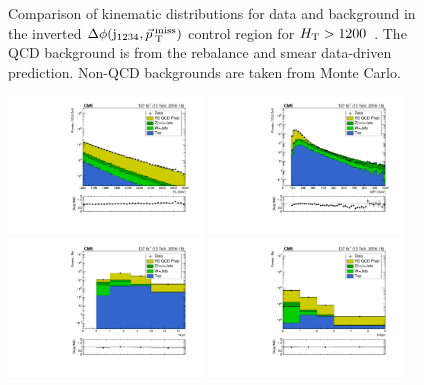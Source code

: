 \begin{figure}[!htbp]
\begin{center}
    \caption{Comparison of kinematic distributions for data and background in the inverted $\Delta\phi(\mathrm{j}_{1234},\vec{p}_{\> \mathrm{T}}^{\> \mathrm{miss}})$ control region for $H_{\mathrm{T}} > 1200$~\GeV. The QCD background is from the
             rebalance and smear data-driven prediction. Non-QCD backgrounds are taken from Monte Carlo.
            }
    \label{Fig:rs_crRSInvertDPhiInclusiveHT1200toInf}
  \end{center}
\end{figure}

\begin{figure}[!htbp]
  \begin{center}
    \includegraphics[width=0.46\textwidth]{figs/qcd/rs_data/c_crRSMT2SideBandInclusiveHT1200toInf_h_ht.pdf}
    \includegraphics[width=0.46\textwidth]{figs/qcd/rs_data/c_crRSMT2SideBandInclusiveHT1200toInf_h_met.pdf}
    \includegraphics[width=0.46\textwidth]{figs/qcd/rs_data/c_crRSMT2SideBandInclusiveHT1200toInf_h_nJet30.pdf}
    \includegraphics[width=0.46\textwidth]{figs/qcd/rs_data/c_crRSMT2SideBandInclusiveHT1200toInf_h_nBJet20.pdf}

\end{center}
\end{figure}
